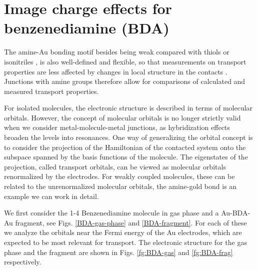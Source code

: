\documentclass[aip,jcp,a4paper,reprint,floatfix,superscriptaddress]{revtex4-1}
\begin{document}
\section{Image charge effects for benzenediamine (BDA)} \label{Sec:BDA}

The amine-Au bonding motif besides being weak compared with thiols or isonitriles \cite{Hakkinen2012}, is also well-defined and flexible, so that measurements on transport properties are less affected by changes in local structure in the contacts \cite{Venkataraman2006,Quek2007,Venkataraman2007}. Junctions with amine groups therefore allow for comparisons of calculated and measured transport properties.

For isolated molecules, the electronic structure is described in terms of molecular orbitals. However, the concept of molecular orbitals is no longer strictly valid when we consider metal-molecule-metal junctions, as hybridization effects broaden the levels into resonances. One way of generalizing the orbital concept is to consider the projection of the Hamiltonian of the contacted system onto the subspace spanned by the basis functions of the molecule. The eigenstates of the projection, called transport orbitals, can be viewed as molecular orbitals renormalized by the electrodes. For weakly coupled molecules, these can be related to the unrenormalized molecular orbitals, the amine-gold bond is an example we can work in detail.




We first consider %
the 1-4 Benzenediamine molecule in gas phase and a Au-BDA-Au fragment, see Figs. \ref{BDA-gas-phase} and \ref{BDA-fragment}. For each of these we analyze the orbitals near the Fermi energy of the Au electrodes, which are expected to be most relevant for transport. The electronic structure for the gas phase and the fragment are shown in Figs. \ref{fg:BDA-gas} and \ref{fg:BDA-frag} respectively.
\end{document}

